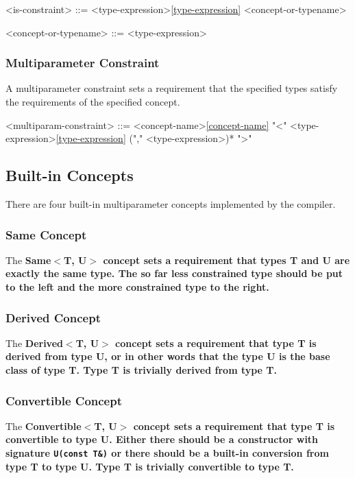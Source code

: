 \documentclass[a4paper,oneside,11pt]{article}
\begin{document}
\begin{grammar}
\label{is-constraint}<is-constraint> ::= <type-expression>\ref{type-expression}  <concept-or-typename>

<concept-or-typename> ::= <type-expression>
\end{grammar}

\subsubsection{Multiparameter Constraint}

A multiparameter constraint sets a requirement that the specified types satisfy the requirements of the specified concept.

\begin{grammar}
\label{multiparam-constraint}<multiparam-constraint> ::= <concept-name>\ref{concept-name} "<" <type-expression>\ref{type-expression} ("," <type-expression>)* ">"
\end{grammar}

\subsection{Built-in Concepts}

There are four built-in multiparameter concepts implemented by the compiler.

\subsubsection{Same Concept}

The \bf{Same$<$T, U$>$} concept sets a requirement that types T and U are exactly the same type.
The so far less constrained type should be put to the left and the more constrained type to the right.

\subsubsection{Derived Concept}

The \bf{Derived$<$T, U$>$} concept sets a requirement that type T is derived from type U, or in other words that the type U is the base class of type T. Type T is trivially derived from type T.

\subsubsection{Convertible Concept}

The \bf{Convertible$<$T, U$>$} concept sets a requirement that type T is convertible to type U.
Either there should be a constructor with signature \verb|U(const T&)| or there should be a built-in conversion
from type T to type U. Type T is trivially convertible to type T.
\end{document}
